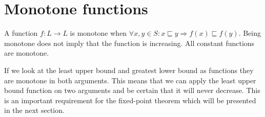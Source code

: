 \section{Monotone functions}
A function $f: L \to L$ is monotone when $\forall x,y \in S : x \sqsubseteq y \Rightarrow f(x) \sqsubseteq f(y)$.
Being monotone does not imply that the function is increasing.
All constant functions are monotone.

If we look at the least upper bound and greatest lower bound as functions they are monotone in both arguments.
This means that we can apply the least upper bound function on two arguments and be certain that it will never decrease.
This is an important requirement for the fixed-point theorem which will be presented in the next section.
